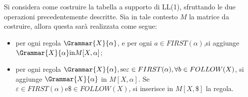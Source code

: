 \documentclass{subfiles}
\begin{document}
Si considera come costruire la tabella a supporto di LL(1), sfruttando le due operazioni precedentemente descritte.
Sia in tale contesto \(M\) la matrice da costruire, allora questa sarà realizzata come segue:
\begin{itemize}
    \item per ogni regola \(\Grammar{X}{\alpha}\), e per ogni \(a \in FIRST(\alpha)\),si aggiunge \(\Grammar{X}{\alpha} \text{in} M[X, \alpha]\);
    \item per ogni regola \(\Grammar{X}{\alpha}, \text{se} \varepsilon \in FIRST(\alpha), \forall b \in FOLLOW(X)\),
          si aggiunge \(\Grammar{X}{\alpha}\) in \(M[X, \alpha]\).
          Se \(\varepsilon \in FIRST(\alpha) \text{e} \$ \in FOLLOW(X)\), si inserisce in \(M[X, \$]\) la regola.
\end{itemize}
\end{document}
